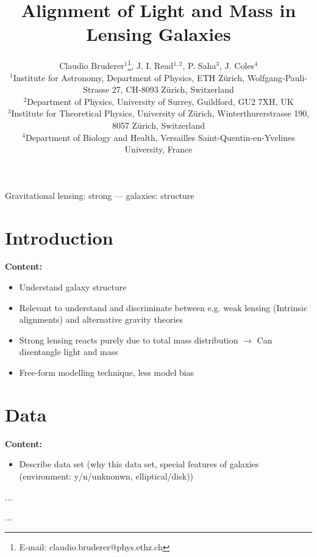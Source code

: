 \documentclass[useAMS,usenatbib]{mn2e}
\title[Alignment of Light and Mass in Lensing Galaxies]{Alignment of Light and Mass in Lensing Galaxies}
\author[Bruderer]{Claudio Bruderer$^{1}$\thanks{E-mail: claudio.bruderer@phys.ethz.ch}, J. I. Read$^{1,2}$, P. Saha$^{3}$, J. Coles$^{4}$\\
$^{1}$Institute for Astronomy, Department of Physics, ETH Z\"urich, Wolfgang-Pauli-Strasse 27, CH-8093 Z\"urich, Switzerland\\
$^{2}$Department of Physics, University of Surrey, Guildford, GU2 7XH, UK\\
$^{3}$Institute for Theoretical Physics, University of Z\"urich, Winterthurerstrasse 190, 8057 Z\"urich, Switzerland\\
$^{4}$Department of Biology and Health, Versailles Saint-Quentin-en-Yvelines University, France
}
\begin{document}
\maketitle

\begin{abstract}
\end{abstract}

\begin{keywords}
Gravitational lensing: strong --- galaxies: structure
\end{keywords}


\section{Introduction}\label{sec:introduction}
\textbf{Content:}
\begin{itemize}
\item Understand galaxy structure
\item Relevant to understand and discriminate between e.g. weak lensing (Intrinsic alignments) and alternative gravity theories
\item Strong lensing reacts purely due to total mass distribution $\rightarrow$ Can disentangle light and mass
\item Free-form modelling technique, less model bias
\end{itemize}


\section{Data}\label{sec:data}
\textbf{Content:}
\begin{itemize}
\item Describe data set (why this data set, special features of galaxies (environment: y/n/unknonwn, elliptical/disk))
\end{itemize}

\begin{table}
  \begin{center}
    \begin{tabular}
      ...
    \end{tabular}
    \caption[width=\linewidth]{Table with lens properties}
    \label{tab:lensproperties}
  \end{center}
\end{table}

\begin{table}
  \begin{center}
    \begin{tabular}
      ...
    \end{tabular}
    \caption[width=\linewidth]{Table with lens properties relevant for modelling (point masses, positions, time delays)}
    \label{tab:lensmodelling}
  \end{center}
\end{table}
\end{document}
